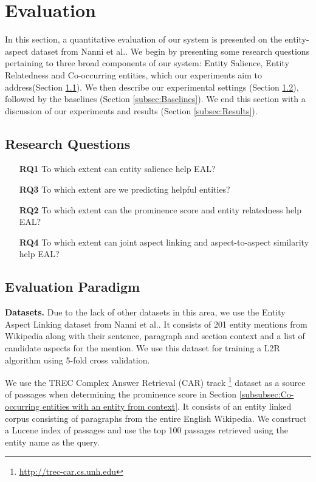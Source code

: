 
\section{Evaluation}
\label{sec:Evaluation}
In this section, a quantitative evaluation of our system is presented on the entity-aspect dataset from Nanni et al.\cite{nanni2018entity}. We begin by presenting some research questions pertaining to three broad components of our system: Entity Salience, Entity Relatedness and Co-occurring entities, which our experiments aim to address(Section \ref{subsec:Research Questions}). We then describe our experimental settings (Section \ref{subsec:Evaluation Paradigm}), followed by the baselines (Section \ref{subsec:Baselines}). We end this section with a discussion of our experiments and results (Section \ref{subsec:Results}).

\subsection{Research Questions}
\label{subsec:Research Questions}

\begin{itemize}
\item[\textbf{RQ1}] To which extent can  entity salience help EAL?
\item[\textbf{RQ3}]  To which extent are we predicting helpful entities?
\item[\textbf{RQ2}] To which extent can the prominence score and entity relatedness help EAL?
\item[\textbf{RQ4}] To which extent can joint aspect linking and aspect-to-aspect similarity help EAL?
\end{itemize}

\subsection{Evaluation Paradigm}
\label{subsec:Evaluation Paradigm}

\textbf{Datasets.} Due to the lack of other datasets in this area, we use the Entity Aspect Linking dataset from Nanni et al.\cite{nanni2018entity}. It consists of 201 entity mentions from Wikipedia along with their sentence, paragraph and section context and a list of candidate aspects for the mention. We use this dataset for training a L2R algorithm using 5-fold cross validation. 

We use the TREC Complex Answer Retrieval (CAR) track \cite{dietz2018trec}\footnote{\url{http://trec-car.cs.unh.edu}} dataset as a source of passages when determining the prominence score in Section \ref{subsubsec:Co-occurring entities with an entity from context}. It consists of an entity linked corpus consisting of paragraphs from the entire English Wikipedia. We construct a Lucene index of passages and use the top 100 passages retrieved using the entity name as the query.

